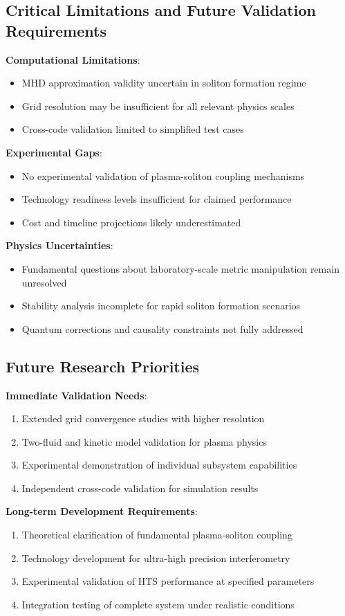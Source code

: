 \documentclass[12pt,a4paper]{article}
\begin{document}
\subsection{Critical Limitations and Future Validation Requirements}
\textbf{Computational Limitations}:
\begin{itemize}
\item MHD approximation validity uncertain in soliton formation regime
\item Grid resolution may be insufficient for all relevant physics scales  
\item Cross-code validation limited to simplified test cases
\end{itemize}

\textbf{Experimental Gaps}:
\begin{itemize}
\item No experimental validation of plasma-soliton coupling mechanisms
\item Technology readiness levels insufficient for claimed performance
\item Cost and timeline projections likely underestimated
\end{itemize}

\textbf{Physics Uncertainties}:
\begin{itemize}
\item Fundamental questions about laboratory-scale metric manipulation remain unresolved
\item Stability analysis incomplete for rapid soliton formation scenarios
\item Quantum corrections and causality constraints not fully addressed
\end{itemize}

\subsection{Future Research Priorities}
\textbf{Immediate Validation Needs}:
\begin{enumerate}
\item Extended grid convergence studies with higher resolution
\item Two-fluid and kinetic model validation for plasma physics
\item Experimental demonstration of individual subsystem capabilities
\item Independent cross-code validation for simulation results
\end{enumerate}

\textbf{Long-term Development Requirements}:
\begin{enumerate}
\item Theoretical clarification of fundamental plasma-soliton coupling
\item Technology development for ultra-high precision interferometry
\item Experimental validation of HTS performance at specified parameters
\item Integration testing of complete system under realistic conditions
\end{enumerate}
\end{document}
